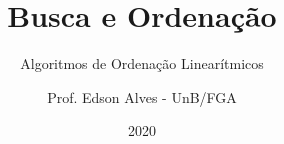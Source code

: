 \title{Busca e Ordenação}
\subtitle{Algoritmos de Ordenação Linearítmicos}
\author{Prof. Edson Alves - UnB/FGA}
\date{2020}
